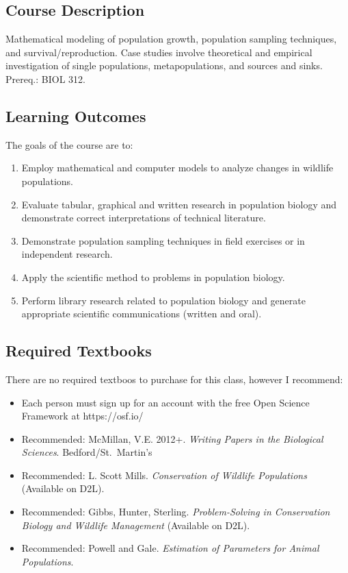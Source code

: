 \documentclass{tufte-handout}
\begin{document}
\begin{fullwidth}

\section{Course Description}

Mathematical modeling of population growth, population sampling techniques, and survival/reproduction. Case studies involve theoretical and empirical investigation of single populations, metapopulations, and sources and sinks. Prereq.: BIOL 312.

\subsection{Learning Outcomes}

The goals of the course are to:


\begin{enumerate}
	\item Employ mathematical and computer models to analyze changes in wildlife populations.	
	\item Evaluate tabular, graphical and written research in population biology and demonstrate correct interpretations of technical literature.
	\item Demonstrate population sampling techniques in field exercises or in independent research.
	\item Apply the scientific method to problems in population biology.
	\item Perform library research related to population biology and generate appropriate scientific communications (written and oral).
\end{enumerate}

\subsection{Required Textbooks}

There are no required textboos to purchase for this class, however I recommend:

\begin{itemize}
	\item Each person must sign up for an account with the free Open Science Framework at https://osf.io/
	\item Recommended: McMillan, V.E. 2012+. \emph{Writing Papers in the Biological Sciences}. Bedford/St.\ Martin's
	\item Recommended: L. Scott Mills. \emph{Conservation of Wildlife Populations} (Available on D2L).
	\item Recommended: Gibbs, Hunter, Sterling. \emph{Problem-Solving in Conservation Biology and Wildlife Management} (Available on D2L).
	\item Recommended: Powell and Gale. \emph{Estimation of Parameters for Animal Populations}.
\end{itemize}


\end{fullwidth}
\end{document}
